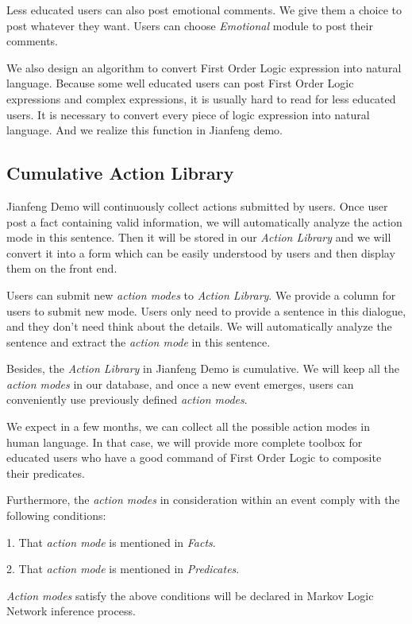 \documentclass[
12pt, %
a4paper, %
oneside, %
headinclude,footinclude, %
BCOR5mm, %
]{scrartcl}
\begin{document}
Less educated users can also post emotional comments. We give them a choice to post whatever they want. Users can choose \textit{Emotional} module to post their comments. 

We also design an algorithm to convert First Order Logic expression into natural language. Because some well educated users can post First Order Logic expressions and complex expressions, it is usually hard to read for less educated users. It is necessary to convert every piece of logic expression into natural language. And we realize this function in Jianfeng demo.




\subsection{Cumulative Action Library}

Jianfeng Demo will continuously collect actions submitted by users. Once user post a fact containing valid information, we will automatically analyze the action mode in this sentence. Then it will be stored in our \textit{Action Library} and we will convert it into a form which can be easily understood by users and then display them on the front end.

Users can submit new \textit{action modes} to \textit{Action Library}. We provide a column for users to submit new mode. Users only need to provide a sentence in this dialogue, and they don't need think about the details. We will automatically analyze the sentence and extract the \textit{action mode} in this sentence. 

Besides, the \textit{Action Library} in Jianfeng Demo is cumulative. We will keep all the \textit{action modes} in our database, and once a new event emerges, users can conveniently use previously defined \textit{action modes}.

We expect in a few months, we can collect all the possible action modes in human language. In that case, we will provide more complete toolbox for educated users who have a good command of First Order Logic to composite their predicates. 

Furthermore, the \textit{action modes} in consideration within an event comply with the following conditions:

1. That \textit{action mode} is mentioned in \textit{Facts}.

2. That \textit{action mode} is mentioned in \textit{Predicates}.

\textit{Action modes} satisfy the above conditions will be declared in Markov Logic Network inference process. 
\end{document}
